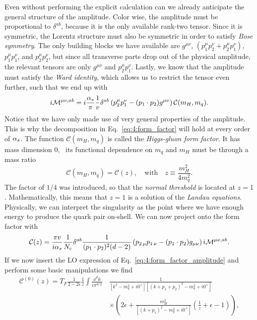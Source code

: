 Even without performing the explicit calculation can we already anticipate the general structure of the amplitude. Color wise, the amplitude must be proportional to $\delta^{ab}$, because it is the only available rank-two tensor. Since it is symmetric, the Lorentz structure must also be symmetric in order to satisfy \textit{Bose symmetry}. The only building blocks we have available are $g^{\mu\nu}$, $(p_1^\mu p_2^\nu + p_2^\mu p_1^\nu)$, $p_1^\mu p_1^\nu$, and $p_2^\mu p_2^\nu$, but since all transverse parts drop out of the physical amplitude, the relevant tensors are only $g^{\mu \nu}$ and $p_2^\mu p_1^\nu$. Lastly, we know that the amplitude must satisfy the \textit{Ward identity}, which allows us to restrict the tensor even further, such that we end up with
\begin{equation}
i \mathcal{M}^{\mu \nu, ab} = i\frac{\alpha_s}{\pi} \frac{1}{v} \delta^{ab} \left(p_2^\mu p_1^\nu - (p_1 \cdot p_2)g^{\mu\nu} \right) \mathcal{C}(m_H, m_q).
\label{eq:4:form_factor}
\end{equation}
Notice that we have only made use of very general properties of the amplitude. This is why the decomposition in Eq.~\eqref{eq:4:form_factor} will hold at every order of $\alpha_s$. The function $\mathcal{C}(m_H, m_q)$ is called the \textit{Higgs-gluon form factor}. It has mass dimension 0, \ie\ its functional dependence on $m_q$ and $m_H$ must be through a mass ratio
\begin{equation}
\mathcal{C} (m_H, m_q) = \mathcal{C}(z), \quad \text{with} \quad z \equiv \frac{m_H^2}{4 m_q^2}.
\end{equation}
The factor of $1/4$ was introduced, so that the \textit{normal threshold} is located at $z = 1$. Mathematically, this means that $z = 1$ is a solution of the \textit{Landau equations}. Physically, we can interpret the singularity as the point where we have enough energy to produce the quark pair on-shell. We can now project onto the form factor with
\begin{equation}
\mathcal{C}(z) = \frac{\pi v}{i \alpha_s} \frac{1}{N_c} \delta^{ab} \frac{1}{(p_1 \cdot p_2)^2 (d - 2)} \left(p_{2\,\mu} p_{1\,\nu} - (p_1 \cdot p_2) g_{\mu\nu} \right) i \mathcal{M}^{\mu \nu, ab}.
\end{equation}
If we now insert the \acs{LO} expression of Eq.~\eqref{eq:4:form_factor_amplitude} and perform some basic manipulations we find
\begin{equation}
\begin{split}
\mathcal{C}^{(0)} (z) = T_F \frac{1}{2 - 2 \epsilon} \frac{1}{z} \int \frac{\dd^d k}{i \pi^{d/2}} \,&\frac{1}{[k^2 - m_q^2 + i0^+][(k + p_1 + p_2)^2 - m_q^2 + i0^+]} \\
& \times \left( 2 \epsilon + \frac{m_H^2}{[(k + p_1)^2 - m_q^2 + i0^+]} \left(\frac{1}{z} + \epsilon - 1 \right) \right),
\label{eq:4:C0_integral_form}
\end{split}
\end{equation}
